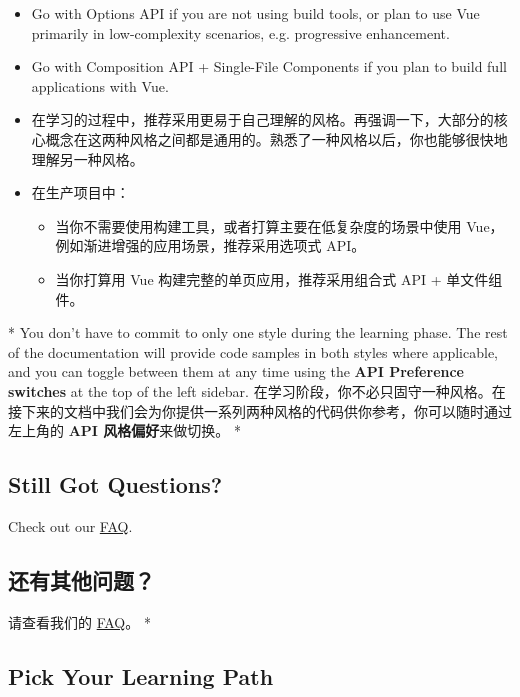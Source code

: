 \begin{paracol}{2}
\begin{itemize}
\begin{itemize}
\item
Go with Options API if you are not using build tools, or plan to use
Vue primarily in low-complexity scenarios, e.g. progressive
enhancement.
\item
Go with Composition API + Single-File Components if you plan to
build full applications with Vue.
\end{itemize}
\end{itemize}
\switchcolumn
\begin{itemize}
\item
在学习的过程中，推荐采用更易于自己理解的风格。再强调一下，大部分的核心概念在这两种风格之间都是通用的。熟悉了一种风格以后，你也能够很快地理解另一种风格。
\item
在生产项目中：

\begin{itemize}
\item
当你不需要使用构建工具，或者打算主要在低复杂度的场景中使用
Vue，例如渐进增强的应用场景，推荐采用选项式 API。
\item
当你打算用 Vue 构建完整的单页应用，推荐采用组合式 API + 单文件组件。
\end{itemize}
\end{itemize}
\switchcolumn[0]*%
You don't have to commit to only one style during the learning phase.
The rest of the documentation will provide code samples in both styles
where applicable, and you can toggle between them at any time using the
\textbf{API Preference switches} at the top of the left sidebar.
\switchcolumn
在学习阶段，你不必只固守一种风格。在接下来的文档中我们会为你提供一系列两种风格的代码供你参考，你可以随时通过左上角的
\textbf{API 风格偏好}来做切换。
\switchcolumn[0]*%
\subsection{Still Got Questions?}
Check out our \href{https://vuejs.org/about/faq}{FAQ}.
\switchcolumn
\subsection{还有其他问题？}
请查看我们的 \href{https://cn.vuejs.org/about/faq.html}{FAQ}。
\switchcolumn[0]*%
\subsection{Pick Your Learning Path}
\switchcolumn

\end{paracol}
